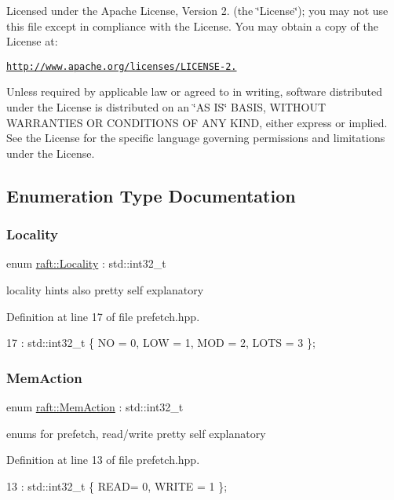 Licensed under the Apache License, Version 2. (the \char`\"{}\+License\char`\"{}); you may not use this file except in compliance with the License. You may obtain a copy of the License at\+:

\href{http://www.apache.org/licenses/LICENSE-2.0}{\tt http\+://www.\+apache.\+org/licenses/\+L\+I\+C\+E\+N\+S\+E-\/2.}

Unless required by applicable law or agreed to in writing, software distributed under the License is distributed on an \char`\"{}\+A\+S I\+S\char`\"{} B\+A\+S\+IS, W\+I\+T\+H\+O\+UT W\+A\+R\+R\+A\+N\+T\+I\+ES OR C\+O\+N\+D\+I\+T\+I\+O\+NS OF A\+NY K\+I\+ND, either express or implied. See the License for the specific language governing permissions and limitations under the License. 

\subsection{Enumeration Type Documentation}
\hypertarget{namespaceraft_ae150b57b2cf963cc45ea81e0c504a46c}{}\label{namespaceraft_ae150b57b2cf963cc45ea81e0c504a46c} 
\subsubsection{\texorpdfstring{Locality}{Locality}}
{\footnotesize\ttfamily enum \hyperlink{namespaceraft_ae150b57b2cf963cc45ea81e0c504a46c}{raft\+::\+Locality} \+: std\+::int32\+\_\+t}

locality hints also pretty self explanatory 

Definition at line 17 of file prefetch.\+hpp.


\begin{DoxyCode}
17 : std::int32\_t \{ NO = 0, LOW = 1, MOD = 2, LOTS = 3 \};
\end{DoxyCode}
\hypertarget{namespaceraft_aa5b30239b85dd904f012b8982a9436b9}{}\label{namespaceraft_aa5b30239b85dd904f012b8982a9436b9} 
\subsubsection{\texorpdfstring{Mem\+Action}{MemAction}}
{\footnotesize\ttfamily enum \hyperlink{namespaceraft_aa5b30239b85dd904f012b8982a9436b9}{raft\+::\+Mem\+Action} \+: std\+::int32\+\_\+t}

enums for prefetch, read/write pretty self explanatory 

Definition at line 13 of file prefetch.\+hpp.


\begin{DoxyCode}
13 : std::int32\_t \{ READ= 0, WRITE = 1 \};
\end{DoxyCode}
